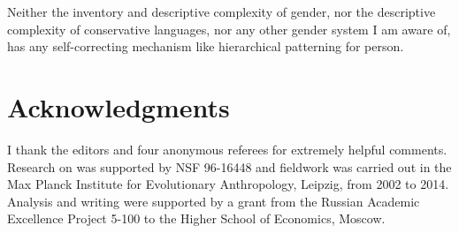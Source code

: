 \documentclass[output=collectionpaper]{langsci/langscibook}
\begin{document}
Neither the inventory and descriptive complexity of  gender, nor the descriptive complexity of conservative  languages, nor any other gender system I am aware of, has any self-correcting mechanism like hierarchical patterning for person.


\section*{Acknowledgments}
I thank the editors and four anonymous referees for extremely helpful comments. Research on  was supported by NSF 96-16448 and  fieldwork was carried out in the Max Planck Institute for Evolutionary Anthropology, Leipzig, from 2002 to 2014. Analysis and writing were supported by a grant from the Russian Academic Excellence Project 5-100 to the Higher School of Economics, Moscow.

\printbibliography[heading=subbibliography,notkeyword=this]
\end{document}
